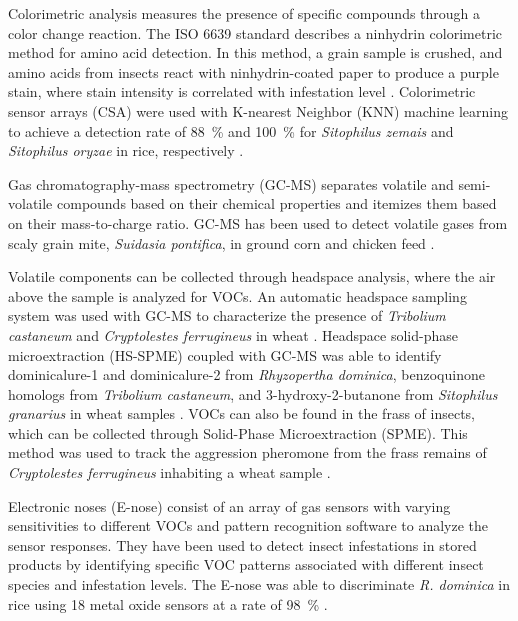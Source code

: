 \documentclass[../Vibro-Acoustic Signatures and Detection Algorithms for Stored Product Insects.tex]{subfiles}
\begin{document}
Colorimetric analysis measures the presence of specific compounds through a color change reaction. The ISO 6639 standard describes a ninhydrin colorimetric method for amino acid detection. In this method, a grain sample is crushed, and amino acids from insects react with ninhydrin-coated paper to produce a purple stain, where stain intensity is correlated with infestation level \cite{ISO6639Cereals1986}. Colorimetric sensor arrays (CSA) were used with K-nearest Neighbor (KNN) machine learning to achieve a detection rate of \SI{88}{\percent} and \SI{100}{\percent} for \textit{Sitophilus zemais} and \textit{Sitophilus oryzae} in rice, respectively \cite{heSolidphasePorphyrinBorondipyrromethene2022}.

Gas chromatography-mass spectrometry (GC-MS) separates volatile and semi-volatile compounds based on their chemical properties and itemizes them based on their mass-to-charge ratio. GC-MS has been used to detect volatile gases from scaly grain mite, \textit{Suidasia pontifica}, in ground corn and chicken feed \cite{gongTechnologiesSystemsPest2026}.

Volatile components can be collected through headspace analysis, where the air above the sample is analyzed for VOCs. An automatic headspace sampling system was used with GC-MS to characterize the presence of \textit{Tribolium castaneum} and \textit{Cryptolestes ferrugineus} in wheat \cite{senthilkumarCharacterizationVolatileOrganic2012}. Headspace solid-phase microextraction (HS-SPME) coupled with GC-MS was able to identify dominicalure-1 and dominicalure-2 from \textit{Rhyzopertha dominica}, benzoquinone homologs from \textit{Tribolium castaneum}, and 3-hydroxy-2-butanone from \textit{Sitophilus granarius} in wheat samples \cite{caiIdentificationBiomarkerVolatile2022}. VOCs can also be found in the frass of insects, which can be collected through Solid-Phase Microextraction (SPME). This method was used to track the aggression pheromone from the frass remains of \textit{Cryptolestes ferrugineus} inhabiting a wheat sample \cite{wongIsolationIdentificationTwo1983}.

Electronic noses (E-nose) consist of an array of gas sensors with varying sensitivities to different VOCs and pattern recognition software to analyze the sensor responses. They have been used to detect insect infestations in stored products by identifying specific VOC patterns associated with different insect species and infestation levels. The E-nose was able to discriminate \textit{R. dominica} in rice using 18 metal oxide sensors at a rate of \SI{98}{\percent}  \cite{srivastavaFuzzyControllerBased2019, srivastavaProbabilisticArtificialNeural2019}.
\end{document}
